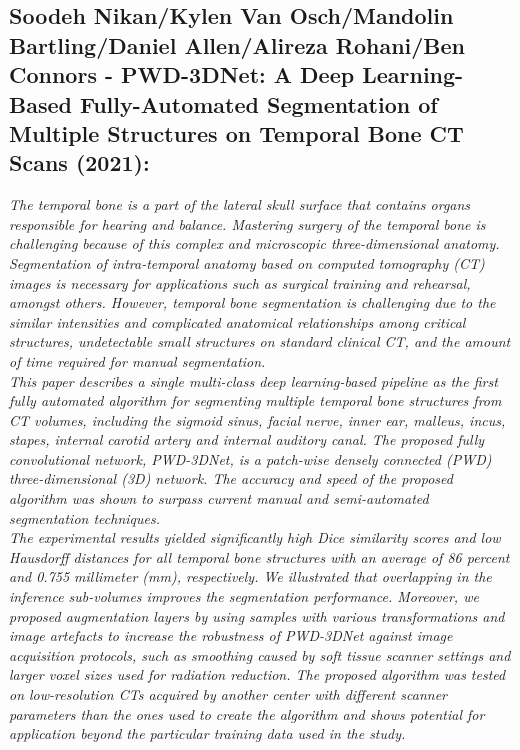 \documentclass[conference]{IEEEtran}
\begin{document}
\subsection{ \textbf{Soodeh Nikan/Kylen Van Osch/Mandolin Bartling/Daniel Allen/Alireza Rohani/Ben Connors - PWD-3DNet: A Deep Learning-Based Fully-Automated Segmentation of Multiple Structures on Temporal Bone CT Scans (2021):}}
\textit{The temporal bone is a part of the lateral skull surface that contains organs responsible for hearing and balance. Mastering surgery of the temporal bone is challenging because of this complex and microscopic three-dimensional anatomy. Segmentation of intra-temporal anatomy based on computed tomography (CT) images is necessary for applications such as surgical training and rehearsal, amongst others. However, temporal bone segmentation is challenging due to the similar intensities and complicated anatomical relationships among critical structures, undetectable small structures on standard clinical CT, and the amount of time required for manual segmentation.
\\This paper describes a single multi-class deep learning-based pipeline as the first fully automated algorithm for segmenting multiple temporal bone structures from CT volumes, including the sigmoid sinus, facial nerve, inner ear, malleus, incus, stapes, internal carotid artery and internal auditory canal. The proposed fully convolutional network, PWD-3DNet, is a patch-wise densely connected (PWD) three-dimensional (3D) network. The accuracy and speed of the proposed algorithm was shown to surpass current manual and semi-automated segmentation techniques.
\\The experimental results yielded significantly high Dice similarity scores and low Hausdorff distances for all temporal bone structures with an average of 86 percent and 0.755 millimeter (mm), respectively. We illustrated that overlapping in the inference sub-volumes improves the segmentation performance. Moreover, we proposed augmentation layers by using samples with various transformations and image artefacts to increase the robustness of PWD-3DNet against image acquisition protocols, such as smoothing caused by soft tissue scanner settings and larger voxel sizes used for radiation reduction. The proposed algorithm was tested on low-resolution CTs acquired by another center with different scanner parameters than the ones used to create the algorithm and shows potential for application beyond the particular training data used in the study.}
\end{document}
